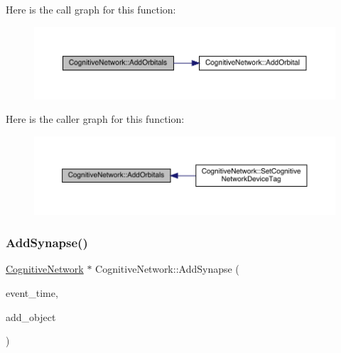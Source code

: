Here is the call graph for this function\+:
\nopagebreak
\begin{figure}[H]
\begin{center}
\leavevmode
\includegraphics[width=350pt]{class_cognitive_network_a9dbf4a9fab3b806d2bd6b2701b7a9548_cgraph}
\end{center}
\end{figure}
Here is the caller graph for this function\+:
\nopagebreak
\begin{figure}[H]
\begin{center}
\leavevmode
\includegraphics[width=350pt]{class_cognitive_network_a9dbf4a9fab3b806d2bd6b2701b7a9548_icgraph}
\end{center}
\end{figure}
\mbox{\label{class_cognitive_network_a4bfdcd2affdfe2adb2da68dba60dff0e}} 
\subsubsection{\texorpdfstring{Add\+Synapse()}{AddSynapse()}}
{\footnotesize\ttfamily \hyperlink{class_cognitive_network}{Cognitive\+Network} $\ast$ Cognitive\+Network\+::\+Add\+Synapse (\begin{DoxyParamCaption}\item[{std\+::chrono\+::time\+\_\+point$<$ \hyperlink{universe_8h_a0ef8d951d1ca5ab3cfaf7ab4c7a6fd80}{Clock} $>$}]{event\+\_\+time,  }\item[{\hyperlink{class_cognitive_network}{Cognitive\+Network} $\ast$}]{add\+\_\+object }\end{DoxyParamCaption})}




